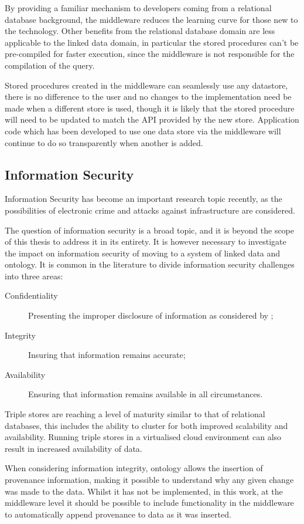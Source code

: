 By providing a familiar mechanism to developers coming from a relational database background, the middleware reduces the learning curve for those new to the technology. Other benefits from the relational database domain are less applicable to the linked data domain, in particular the stored procedures can't be pre-compiled for faster execution, since the middleware is not responsible for the compilation of the query.

Stored procedures created in the middleware can seamlessly use any datastore, there is no difference to the user and no changes to the implementation need be made when a different store is used, though it is likely that the stored procedure will need to be updated to match the API provided by the new store. Application code which has been developed to use one data store via the middleware will continue to do so transparently when another is added. 


\subsection{Information Security}
Information Security has become an important research topic recently, as the possibilities of electronic crime and attacks against infrastructure are considered.

The question of information security is a broad topic, and it is beyond the scope of this thesis to address it in its entirety. It is however necessary to investigate the impact on information security of moving to a system of linked data and ontology.
It is common in the literature to divide information security challenges into three areas: 
\begin{description}
    \item[Confidentiality] Presenting the improper disclosure of information as considered by \citep{Erlingsson2016};
    \item[Integrity] Insuring that information remains accurate;
    \item[Availability] Ensuring that information remains available in all circumstances. 
\end{description}

Triple stores are reaching a level of maturity similar to that of relational databases, this includes the ability to cluster for both improved scalability and availability. Running triple stores in a virtualised cloud environment can also result in increased availability of data. 

When considering information integrity, ontology allows the insertion of provenance information, making it possible to understand why any given change was made to the data. Whilst it has not be implemented, in this work, at the middleware level it should be possible to include functionality in the middleware to automatically append provenance to data as it was inserted. 

